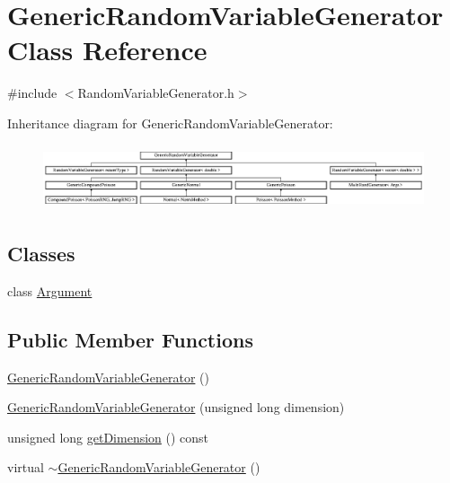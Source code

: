 \hypertarget{class_generic_random_variable_generator}{}\section{Generic\+Random\+Variable\+Generator Class Reference}
\label{class_generic_random_variable_generator}


{\ttfamily \#include $<$Random\+Variable\+Generator.\+h$>$}

Inheritance diagram for Generic\+Random\+Variable\+Generator\+:\begin{figure}[H]
\begin{center}
\leavevmode
\includegraphics[height=1.917808cm]{class_generic_random_variable_generator}
\end{center}
\end{figure}
\subsection*{Classes}
\begin{DoxyCompactItemize}
\item 
class \hyperlink{class_generic_random_variable_generator_1_1_argument}{Argument}
\end{DoxyCompactItemize}
\subsection*{Public Member Functions}
\begin{DoxyCompactItemize}
\item 
\hyperlink{class_generic_random_variable_generator_a4e113dd8b32eb72dc0719b677a938358}{Generic\+Random\+Variable\+Generator} ()
\item 
\hyperlink{class_generic_random_variable_generator_a331a9e178a7f44349e03a6ed21b940e0}{Generic\+Random\+Variable\+Generator} (unsigned long dimension)
\item 
unsigned long \hyperlink{class_generic_random_variable_generator_aaca8d2c084b88a58ee0825f60361caa5}{get\+Dimension} () const
\item 
virtual \hyperlink{class_generic_random_variable_generator_a5a95e8b9b2432f2cbbf1f7b32773d036}{$\sim$\+Generic\+Random\+Variable\+Generator} ()
\end{DoxyCompactItemize}
